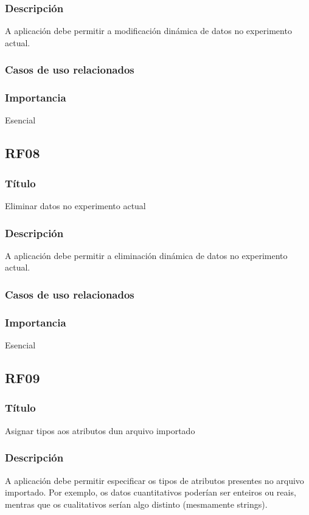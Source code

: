 \subsubsection{Descripción}
A aplicación debe permitir a modificación dinámica de datos no experimento actual.
\subsubsection{Casos de uso relacionados}
\subsubsection{Importancia}
Esencial

\subsection*{RF08}
\subsubsection{Título}
Eliminar datos no experimento actual
\subsubsection{Descripción}
A aplicación debe permitir a eliminación dinámica de datos no experimento actual.
\subsubsection{Casos de uso relacionados}
\subsubsection{Importancia}
Esencial

\subsection*{RF09}
\subsubsection{Título}
Asignar tipos aos atributos dun arquivo importado
\subsubsection{Descripción}
A aplicación debe permitir especificar os tipos de atributos presentes no arquivo importado. Por exemplo, os datos cuantitativos poderían ser enteiros ou reais, mentras que os cualitativos serían algo distinto (mesmamente strings).

